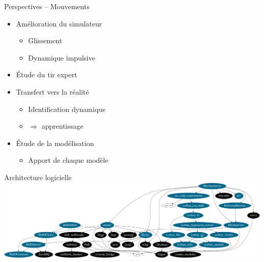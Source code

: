 \begin{frame}[noframenumbering]{Perspectives -- Mouvements}
    \begin{itemize}
        \setlength\itemsep{1.0em}
        \item Amélioration du simulateur
            \begin{itemize}
                \item Glissement
                \item Dynamique impulsive
            \end{itemize}
        \item Étude du tir expert
        \item Transfert vers la réalité
            \begin{itemize}
                \item Identification dynamique
                \item {} $\Rightarrow$ apprentissage
            \end{itemize}
        \item Étude de la modélisation
            \begin{itemize}
                \item Apport de chaque modèle
            \end{itemize}
    \end{itemize}
\end{frame}

\begin{frame}[noframenumbering]{Architecture logicielle}
    \centering
    \includegraphics[width=1.0\linewidth]{../media/code_graph.png}
\end{frame}

